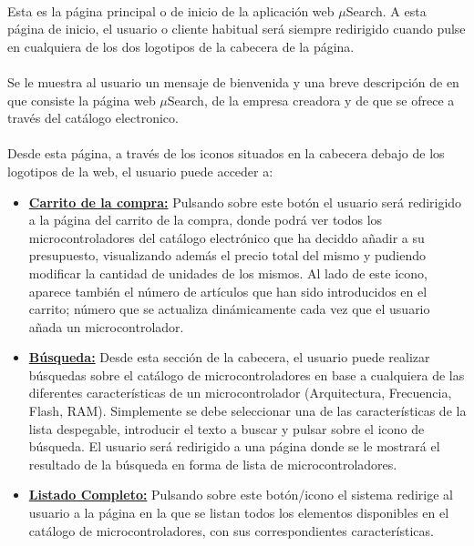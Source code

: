 \paragraph{}Esta es la página principal o de inicio de la aplicación web $\mu$Search. A esta página de inicio, el usuario o cliente habitual será siempre redirigido cuando pulse en cualquiera de los dos logotipos de la cabecera de la página.

\paragraph{}Se le muestra al usuario un mensaje de bienvenida y una breve descripción de en que consiste la página web $\mu$Search, de la empresa creadora y de que se ofrece a través del catálogo electronico.

\paragraph{}Desde esta página, a través de los iconos situados en la cabecera debajo de los logotipos de la web, el usuario puede acceder a:
\begin{itemize}
	\item \underline{\textbf{Carrito de la compra:}} Pulsando sobre este botón el usuario será redirigido a la página del carrito de la compra, donde podrá ver todos los microcontroladores del catálogo electrónico que ha deciddo añadir a su presupuesto, visualizando además el precio total del mismo y pudiendo modificar la cantidad de unidades de los mismos.
	Al lado de este icono, aparece también el número de artículos que han sido introducidos en el carrito; número que se actualiza dinámicamente cada vez que el usuario añada un microcontrolador.
	
	\item \underline{\textbf{Búsqueda:}} Desde esta sección de la cabecera, el usuario puede realizar búsquedas sobre el catálogo de microcontroladores en base a cualquiera de las diferentes características de un microcontrolador (Arquitectura, Frecuencia, Flash, RAM). Simplemente se debe seleccionar una de las características de la lista despegable, introducir el texto a buscar y pulsar sobre el icono de búsqueda.
	El usuario será redirigido a una página donde se le mostrará el resultado de la búsqueda en forma de lista de microcontroladores.
	
	\item \underline{\textbf{Listado Completo:}} Pulsando sobre este botón/icono el sistema redirige al usuario a la página en la que se listan todos los elementos disponibles en el catálogo de microcontroladores, con sus correspondientes características.
	
\end{itemize}